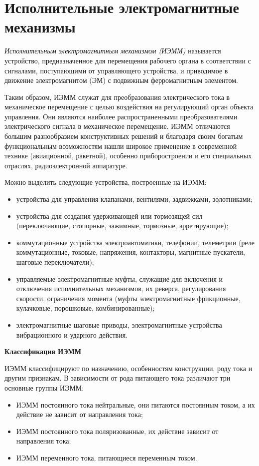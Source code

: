 \chapter{Исполнительные электромагнитные механизмы}

\textit{Исполнительным электромагнитным механизмом (ИЭММ)} называется устройство, предназначенное для перемещения рабочего органа в соответствии с сигналами, поступающими от управляющего устройства, и приводимое в движение электромагнитом (ЭМ) с подвижным ферромагнитным элементом. 

Таким образом, ИЭММ служат для преобразования электрического тока в механическое перемещение с целью воздействия на регулирующий орган объекта управления. Они являются наиболее распространенными преобразователями электрического сигнала в механическое перемещение. ИЭММ отличаются большим разнообразием конструктивных решений и благодаря своим богатым функциональным возможностям нашли широкое применение в современной технике (авиационной, ракетной), особенно приборостроении и его специальных отраслях, радиоэлектронной аппаратуре. 

Можно выделить следующие устройства, построенные на ИЭММ:
\begin{itemize}
\item устройства для управления клапанами, вентилями, задвижками, золотниками;
\item устройства для создания удерживающей или тормозящей сил (переключающие, стопорные, зажимные, тормозные, арретирующие);
\item коммутационные устройства электроавтоматики, телефонии, телеметрии (реле коммутационные, токовые, напряжения, контакторы, магнитные пускатели, шаговые переключатели);
\item управляемые электромагнитные муфты, служащие для включения и отключения исполнительных механизмов, их реверса, регулирования скорости, ограничения момента (муфты электромагнитные фрикционные, кулачковые, порошковые, комбинированные);
\item электромагнитные шаговые приводы, электромагнитные устройства вибрационного и ударного действия.
\end{itemize}

\begin{flushleft}
\textbf{Классификация ИЭММ}
\end{flushleft}

ИЭММ классифицируют по назначению, особенностям конструкции, роду тока и другим признакам. В зависимости от рода питающего тока различают три основные группы ИЭММ:
\begin{itemize}
\item ИЭММ постоянного тока нейтральные, они питаются постоянным током, а их действие не зависит от направления тока;
\item ИЭММ постоянного тока поляризованные, их действие зависит от направления тока; 
\item ИЭММ переменного тока, питающиеся переменным током.
\end{itemize}


